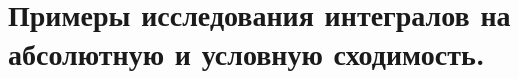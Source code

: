 \documentclass[../main.tex]{subfiles}
\begin{document}
\newpage
\section{Примеры исследования интегралов на абсолютную и условную сходимость.}
\end{document}
